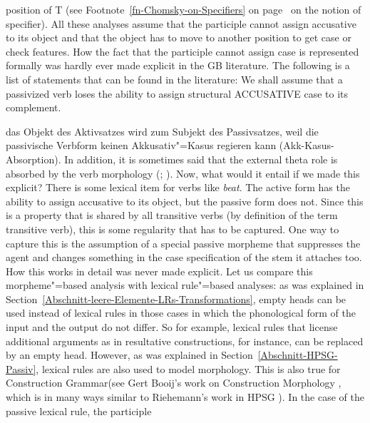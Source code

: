 position of T (see Footnote~\ref{fn-Chomsky-on-Specifiers} on
page~\pageref{fn-Chomsky-on-Specifiers} on the notion of specifier). All these analyses assume that
the participle cannot assign accusative to its object and that the object has to move to another
position to get case or check features. How the fact that the participle cannot assign case is
represented formally was hardly ever made explicit in the GB literature.
The following is a list of statements that can be found in the literature:
\eal
\ex We shall assume that a passivized verb loses the ability to assign structural ACCUSATIVE case to
its complement. \citep[]{Haegeman94a-u}

\ex das Objekt des Aktivsatzes wird zum Subjekt des Passivsatzes, weil die passivische Verbform
keinen Akkusativ"=Kasus regieren kann (Akk-Kasus-Absorption). \citep[]{Lohnstein2014a} 
\zl
In addition, it is sometimes said that the external theta role is absorbed by the verb morphology
(\citealp{Jaeggli86a}; 
\citealp[]{Haegeman94a-u}). Now, what would it entail if we made this explicit? There is some
lexical item for verbs like \emph{beat}. The active form has the ability to assign accusative to its
object, but the passive form does not. Since this is a property that is shared by all transitive
verbs (by definition of the term transitive verb), this is some regularity that has to be
captured. One way to capture this is the assumption of a special passive morpheme that suppresses
the agent and changes something in the case specification of the stem it attaches too. How this
works in detail was never made explicit.
Let us compare this morpheme"=based analysis with lexical rule"=based analyses: as was explained in
Section~\ref{Abschnitt-leere-Elemente-LRs-Transformations}, empty heads can be used instead of
lexical rules in those cases in which the phonological form of the input and the output do not
differ. So for example, lexical rules that license additional arguments as in
resultative constructions, for instance, can be replaced by an empty head. However, as was explained in Section~\ref{Abschnitt-HPSG-Passiv}, lexical 
rules are also used to model morphology. This is also true for Construction Grammar\indexcxg (see
Gert Booij's work on Construction Morphology \citeyearpar{Booij2010a}, which is in many ways similar to Riehemann's work in
HPSG \citeyearpar{Riehemann93a,Riehemann98a}). In the case of the passive lexical rule, the participle
